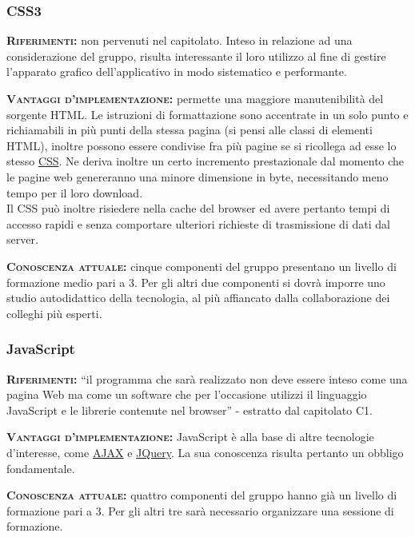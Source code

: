 \subsubsection{CSS3}
\begin{description}
	\item{\scshape\bfseries Riferimenti:} non pervenuti nel capitolato. Inteso in relazione ad una considerazione del gruppo, risulta interessante il loro utilizzo al fine di gestire l'apparato grafico dell'applicativo in modo sistematico e performante.
	
\item{\scshape\bfseries Vantaggi d'implementazione:} permette una maggiore manutenibilità del sorgente HTML. Le istruzioni di formattazione sono accentrate in un solo punto e richiamabili in più punti della stessa pagina (si pensi alle classi di elementi HTML), inoltre possono essere condivise fra più pagine se si ricollega ad esse lo stesso \underline{CSS}\@. Ne deriva inoltre un certo incremento prestazionale dal momento che le pagine web genereranno una minore dimensione in byte, necessitando meno tempo per il loro download. \\Il CSS può inoltre risiedere nella cache del browser ed avere pertanto tempi di accesso rapidi e senza comportare ulteriori richieste di trasmissione di dati dal server.
	
	\item{\scshape\bfseries Conoscenza attuale:} cinque componenti del gruppo presentano un livello di formazione medio pari a 3. Per gli altri due componenti si dovrà imporre uno studio autodidattico della tecnologia, al più affiancato dalla collaborazione dei colleghi più esperti.
\end{description}

\subsubsection{JavaScript}
\begin{description} 
	\item{\scshape\bfseries Riferimenti:}
  ``il programma che sarà realizzato non deve essere inteso come una pagina Web ma come un software che per l'occasione utilizzi il linguaggio JavaScript e le librerie contenute nel browser'' - estratto dal capitolato C1.

	\item{\scshape\bfseries Vantaggi d'implementazione:} JavaScript è alla base di altre tecnologie d'interesse, come \underline{AJAX} e \underline{JQuery}. La sua conoscenza risulta pertanto un obbligo fondamentale.

	\item{\scshape\bfseries Conoscenza attuale:} quattro componenti del gruppo hanno già un livello di formazione pari a 3. Per gli altri tre sarà necessario organizzare una sessione di formazione.
\end{description}


